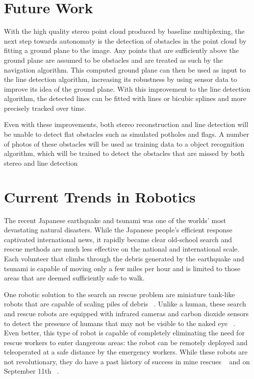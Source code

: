 \documentclass[twocolumn,11pt]{article}
\begin{document}
\section{Future Work}
\label{sec:future}
With the high quality stereo point cloud produced by baseline multiplexing, the next step towards autonomaty is the detection of obstacles in the point cloud by fitting a ground plane to the image. Any points that are sufficiently above the ground plane are assumed to be obstacles and are treated as such by the navigation algorithm. This computed ground plane can then be used as input to the line detection algorithm, increasing its robustness by using sensor data to improve its idea of the ground plane. With this improvement to the line detection algorithm, the detected lines can be fitted with lines or bicubic splines and more precisely tracked over time.

Even with these improvements, both stereo reconstruction and line detection will be unable to detect flat obstacles such as simulated potholes and flags. A number of photos of these obstacles will be used as training data to a object recognition algorithm, which will be trained to detect the obstacles that are missed by both stereo and line detection

\section{Current Trends in Robotics}
\label{sec:econ}
The recent Japanese earthquake and tsunami was one of the worlds' most
devastating natural disasters. While the Japanese people's efficient response
captivated international news, it rapidly became clear old-school search and
rescue methods are much less effective on the national and international scale.
Each volunteer that climbs through the debris generated by the earthquake and
tsunami is capable of moving only a few miles per hour and is limited to those
areas that are deemed sufficiently safe to walk.

One robotic solution to the search an rescue problem are miniature tank-like
robots that are capable of scaling piles of debris ~\cite{search}. Unlike a
human, these search and rescue robots are equipped with infrared cameras and
carbon dioxide sensors to detect the presence of humans that may not be visible
to the naked eye ~\cite{search}. Even better, this type of robot is capable of
completely eliminating the need for rescue workers to enter dangerous areas:
the robot can be remotely deployed and teleoperated at a safe distance by the
emergency workers. While these robots are not revolutionary, they do have a
past history of success in mine rescues ~\cite{mine} and on September 11th
~\cite{sept11}.
\end{document}
